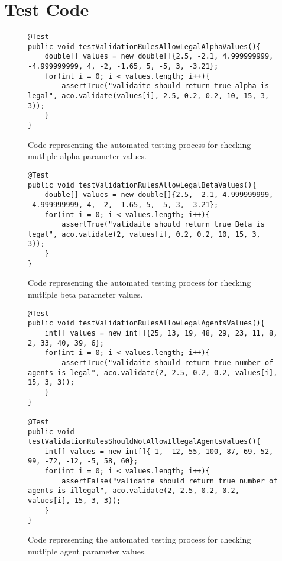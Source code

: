 \chapter{Test Code}
\renewcommand{\thechapter}{\Alph{chapter}}

\begin{figure}[H]
\begin{lstlisting}
@Test
public void testValidationRulesAllowLegalAlphaValues(){
	double[] values = new double[]{2.5, -2.1, 4.999999999, -4.999999999, 4, -2, -1.65, 5, -5, 3, -3.21};
	for(int i = 0; i < values.length; i++){
		assertTrue("validaite should return true alpha is legal", aco.validate(values[i], 2.5, 0.2, 0.2, 10, 15, 3, 3));
	}
}
\end{lstlisting}
\caption{Code representing the automated testing process for checking mutliple alpha parameter values.}
\label{testAlpha}
\end{figure}

\begin{figure}[H]
\begin{lstlisting}
@Test
public void testValidationRulesAllowLegalBetaValues(){
	double[] values = new double[]{2.5, -2.1, 4.999999999, -4.999999999, 4, -2, -1.65, 5, -5, 3, -3.21};
	for(int i = 0; i < values.length; i++){
		assertTrue("validaite should return true Beta is legal", aco.validate(2, values[i], 0.2, 0.2, 10, 15, 3, 3));
	}
}
\end{lstlisting}
\caption{Code representing the automated testing process for checking mutliple beta parameter values.}
\label{testBeta}
\end{figure}

\begin{figure}[H]
\begin{lstlisting}
@Test
public void testValidationRulesAllowLegalAgentsValues(){
	int[] values = new int[]{25, 13, 19, 48, 29, 23, 11, 8, 2, 33, 40, 39, 6};
	for(int i = 0; i < values.length; i++){
		assertTrue("validaite should return true number of agents is legal", aco.validate(2, 2.5, 0.2, 0.2, values[i], 15, 3, 3));
	}
}

@Test
public void testValidationRulesShouldNotAllowIllegalAgentsValues(){
	int[] values = new int[]{-1, -12, 55, 100, 87, 69, 52, 99, -72, -12, -5, 58, 60};
	for(int i = 0; i < values.length; i++){
		assertFalse("validaite should return true number of agents is illegal", aco.validate(2, 2.5, 0.2, 0.2, values[i], 15, 3, 3));
	}
}
\end{lstlisting}
\caption{Code representing the automated testing process for checking mutliple agent parameter values.}
\label{testAgent}
\end{figure}

